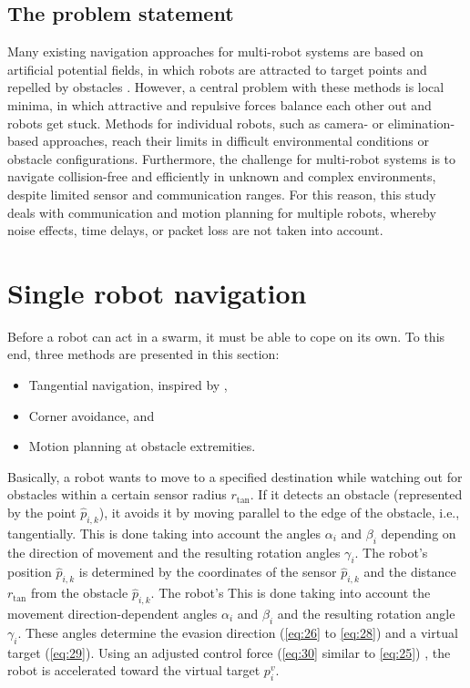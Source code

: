 \documentclass[conference]{IEEEtran}
\begin{document}
\subsection*{The problem statement}
Many existing navigation approaches for multi-robot systems are based on artificial 
potential fields, in which robots are attracted to target points and repelled by obstacles 
. However, a central problem with these methods is local minima, in which 
attractive and repulsive forces balance each other out and robots get stuck. 
Methods for individual robots, such as camera- or elimination-based approaches, reach their limits in 
difficult environmental conditions or obstacle configurations.
Furthermore, the challenge for multi-robot systems is to navigate collision-free and 
efficiently in unknown and complex environments, despite limited 
sensor and communication ranges. 
For this reason, this study deals with communication and motion planning 
for multiple robots,
whereby noise effects, time delays, or packet loss are not taken into account.


\section{Single robot navigation}
\label{sec:Single robot navigation}
Before a robot can act in a swarm, it must be able to cope on its own. To this end, 
three methods are presented in this section:
\begin{itemize}
    \item Tangential navigation, inspired by \cite{Brandao.2013},
    \item Corner avoidance, and
    \item Motion planning at obstacle extremities.
\end{itemize}

Basically, a robot wants to move to a specified destination while watching out for obstacles within a certain sensor radius \(r_{\mathrm{tan}}\). If it detects an obstacle (represented by the point \( \hat{p}_{i,k} \)), it avoids it by moving parallel to the edge of the obstacle, i.e., tangentially.
This is done taking into account the angles \( \alpha_i \) and \( \beta_i \) depending on the direction of movement and the resulting rotation angles \( \gamma_i \).
The robot's position \( \hat{p}_{i,k} \) is determined by the coordinates of the sensor \( \hat{p}_{i,k} \) and the distance \( r_{\mathrm{tan}} \) from the obstacle \( \hat{p}_{i,k} \).
The robot's This is done taking into account 
the movement direction-dependent angles \( \alpha_i \) and 
\( \beta_i \) and the resulting rotation angle \( \gamma_i \). 
These angles determine the evasion direction 
(\eqref{eq:26} to \eqref{eq:28}) and a virtual target 
(\eqref{eq:29}). Using an adjusted control force 
(\eqref{eq:30} similar to \eqref{eq:25}) ,
 the robot is accelerated toward the virtual target $p_i^v$.
\end{document}
